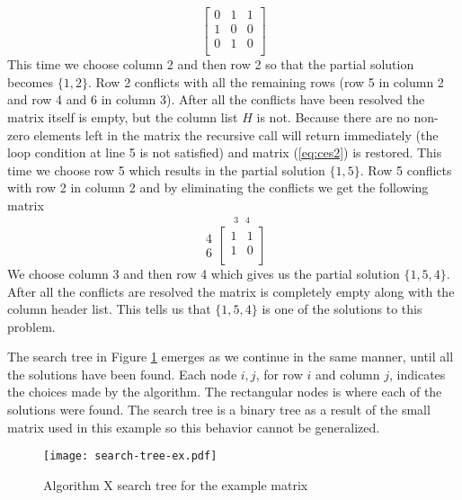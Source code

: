 \begin{example}
\begin{equation}
{\begin{bmatrix}
			0 & 1 & 1 \\
			1 & 0 & 0 \\
			0 & 1 & 0 \\
		\end{bmatrix}
	}
\end{equation}
This time we choose column 2 and then row 2 so that the partial solution becomes $\{ 1, 2 \}$.
Row 2 conflicts with all the remaining rows (row 5 in column 2 and row 4 and 6 in column 3).
After all the conflicts have been resolved the matrix itself is empty, but the column list $H$ is not.
Because there are no non-zero elements left in the matrix the recursive call will return immediately (the loop condition at line 5 is not satisfied) and matrix (\ref{eq:ces2}) is restored.
This time we choose row 5 which results in the partial solution $\{ 1, 5 \}$.
Row 5 conflicts with row 2 in column 2 and by eliminating the conflicts we get the following matrix
\begin{equation*}
	\label{eq:ces3}
	\begin{array}{r} 4\\ 6 \end{array}
	\stackrel{
		\begin{array}{ccc} 3 & 4 \end{array}
	}{
		\begin{bmatrix}
			1 & 1 \\
			1 & 0 \\
		\end{bmatrix}
	}
\end{equation*}
We choose column 3 and then row 4 which gives us the partial solution $\{ 1, 5, 4 \}$.
After all the conflicts are resolved the matrix is completely empty along with the column header list.
This tells us that $\{ 1, 5, 4 \}$ is one of the solutions to this problem.

The search tree in Figure \ref{fig:ex_tree} emerges as we continue in the same manner, until all the solutions have been found.
Each node $i,j$, for row $i$ and column $j$, indicates the choices made by the algorithm.
The rectangular nodes is where each of the solutions were found.
The search tree is a binary tree as a result of the small matrix used in this example so this behavior cannot be generalized.
\begin{figure}[htbp]
	\centering 
	\texttt{[image: search-tree-ex.pdf]}
	\caption{Algorithm X search tree for the example matrix}
	\label{fig:ex_tree}
\end{figure}

\end{example}

